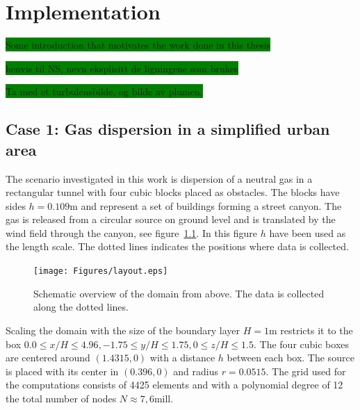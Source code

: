 
\chapter{Implementation} %

\label{implementation} %



\colorbox{green}{Some introduction that motivates the work done in this thesis}

\colorbox{green}{henvis til NS, nevn eksplisitt de ligningene som brukes}

\colorbox{green}{Ta med et turbulensbilde, og bilde av plumen.}





\section{Case 1: Gas dispersion in a simplified urban area}
The scenario investigated in this work is dispersion of a neutral gas in a rectangular tunnel
with four cubic blocks placed as obstacles. The blocks have sides $h = 0.109$m and represent a 
set of buildings forming a street canyon. The gas is released from a circular source on 
ground level and
is translated by the wind field through the canyon, see figure~\ref{fig:layout}.
In this figure $h$ have been used as the length scale. The dotted lines
indicates the positions where data is collected.
%
\begin{figure}[h]
	\texttt{[image: Figures/layout.eps]}
	\caption{Schematic overview of the domain from above. The data is collected along the dotted lines.}
	\label{fig:layout}
\end{figure}
%

Scaling the domain with the size of the boundary layer $H =1$m restricts it to
the box $0.0\leq x/H \leq 4.96,-1.75\leq y/H \leq 1.75, 0\leq z/H \leq 1.5$.
The four cubic boxes are centered around $(1.4315,0)$ with a distance $h$ between each box.
The source is placed with its center in $(0.396,0)$ and radius $r = 0.0515$.
The grid used for the computations consists of 4425 elements and with a polynomial degree of
12 the total number of nodes $N\approx 7,6$mill. 


